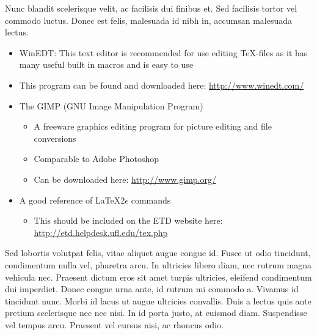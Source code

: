 Nunc blandit scelerisque velit, ac facilisis dui finibus et. Sed facilisis tortor vel commodo luctus. Donec est felis, malesuada id nibh in, accumsan malesuada lectus.
\begin{itemize} %
    \item WinEDT: This text editor is recommended for use editing \TeX-files as it has many useful built in macros and is easy to use  %
    \item This program can be found and downloaded here: \url{http://www.winedt.com/} %
    \item The GIMP (GNU Image Manipulation Program) %
    \begin{itemize}%
        \item A freeware graphics editing program for picture editing and file conversions %
        \item Comparable to Adobe Photoshop %
        \item Can be downloaded here: \url{http://www.gimp.org/}%
    \end{itemize}
    \item A good reference of \LaTeX 2\ensuremath{\epsilon} commands%
    \begin{itemize}
        \item This should be included on the ETD website here: \url{http://etd.helpdesk.ufl.edu/tex.php}
    \end{itemize}
\end{itemize} %


Sed lobortis volutpat felis, vitae aliquet augue congue id. Fusce ut odio tincidunt, condimentum nulla vel, pharetra arcu. In ultricies libero diam, nec rutrum magna vehicula nec. Praesent dictum eros sit amet turpis ultricies, eleifend condimentum dui imperdiet. Donec congue urna ante, id rutrum mi commodo a. Vivamus id tincidunt nunc. Morbi id lacus ut augue ultricies convallis. Duis a lectus quis ante pretium scelerisque nec nec nisi. In id porta justo, at euismod diam. Suspendisse vel tempus arcu. Praesent vel cursus nisi, ac rhoncus odio.

